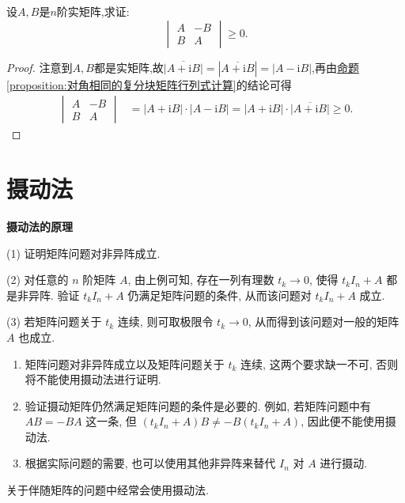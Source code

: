 \documentclass[lang=cn,newtx,10pt,scheme=chinese]{elegantbook}
\begin{document}
\begin{example}
设\(A,B\)是\(n\)阶实矩阵,求证:
\[
\begin{vmatrix}
A & -B\\
B & A
\end{vmatrix}\geq0.
\]
\end{example}
\begin{proof}
注意到\(A,B\)都是实矩阵,故\(\overline{|A + \mathrm{i}B|}=|\overline{A + \mathrm{i}B}|=|A - \mathrm{i}B|\),再由\hyperref[proposition:对角相同的复分块矩阵行列式计算]{命题\ref{proposition:对角相同的复分块矩阵行列式计算}}的结论可得
\begin{align*}
\begin{vmatrix}
A & -B\\
B & A
\end{vmatrix}&=|A + \mathrm{i}B|\cdot|A - \mathrm{i}B|=|A + \mathrm{i}B|\cdot\overline{|A + \mathrm{i}B|}\geq0.
\end{align*}
\end{proof}

\section{摄动法}
\textbf{摄动法的原理}

(1) 证明矩阵问题对非异阵成立.

(2) 对任意的 \(n\) 阶矩阵 \(A\), 由上例可知, 存在一列有理数 \(t_k\rightarrow0\), 使得 \(t_kI_n + A\) 都是非异阵. 验证 \(t_kI_n + A\) 仍满足矩阵问题的条件, 从而该问题对 \(t_kI_n + A\) 成立.

(3) 若矩阵问题关于 \(t_k\) 连续, 则可取极限令 \(t_k\rightarrow0\), 从而得到该问题对一般的矩阵 \(A\) 也成立.

\begin{remark}
\begin{enumerate}
    \item 矩阵问题对非异阵成立以及矩阵问题关于 \(t_k\) 连续, 这两个要求缺一不可, 否则将不能使用摄动法进行证明.
    \item 验证摄动矩阵仍然满足矩阵问题的条件是必要的. 例如, 若矩阵问题中有 \(AB=-BA\) 这一条, 但 \((t_kI_n + A)B\neq -B(t_kI_n + A)\), 因此便不能使用摄动法.
    \item 根据实际问题的需要, 也可以使用其他非异阵来替代 \(I_n\) 对 \(A\) 进行摄动.
\end{enumerate}
\end{remark}
\begin{note}
关于伴随矩阵的问题中经常会使用摄动法.
\end{note}
\end{document}
